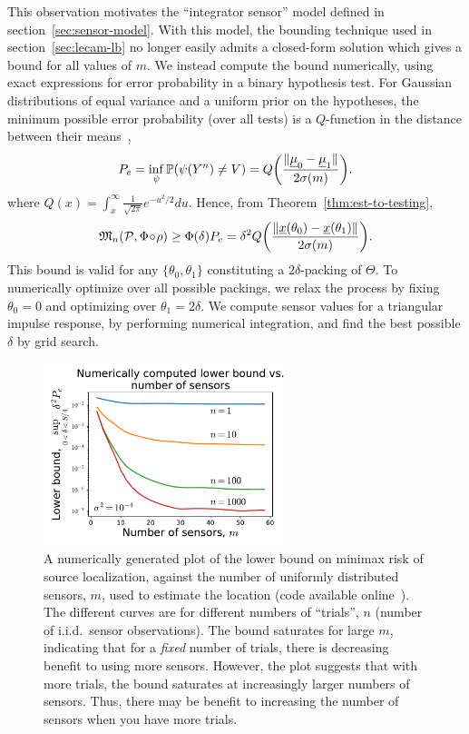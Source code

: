 \documentclass[conference]{IEEEtran}
\providecommand{\v}{}
\renewcommand{\v}[1]{\underline{#1}}
\DeclarePairedDelimiter\norm{\lVert}{\rVert}
\newcommand{\Phiorho}{\Phi\!\circ\!\rho}
\begin{document}
This observation motivates the ``integrator sensor'' model defined in
section~\ref{sec:sensor-model}. With this model, the bounding technique used in
section~\ref{sec:lecam-lb} no longer easily admits a closed-form solution which
gives a bound for all values of $m$. We instead compute the bound numerically,
using exact expressions for error probability in a binary hypothesis test. For
Gaussian distributions of equal variance and a uniform prior on the hypotheses,
the minimum possible error probability (over all tests) is a $Q$-function in
the distance between their means~\cite[Ch.~7]{Scharf1991Statistical},
\begin{equation}
	P_e = \inf_\psi \mathbb P(\psi(Y^n) \neq V) = Q\bigg(\frac{\norm{\v\mu_0 - \v\mu_1}}{2\sigma(m)}\bigg).
\end{equation}
where $Q(x) = \int_x^\infty \frac{1}{\sqrt{2\pi}} e^{-u^2/2} du$. Hence, from
Theorem~\ref{thm:est-to-testing},
\begin{equation}
	\mathfrak{M}_n(\mathcal{P}, \Phiorho) \geq \Phi(\delta) P_e = \delta^2 Q\bigg(\frac{\norm{\v x(\theta_0) - \v x(\theta_1)}}{2\sigma(m)}\bigg).
\end{equation}
This bound is valid for any $\{\theta_0, \theta_1\}$ constituting a
$2\delta$-packing of $\Theta$. To numerically optimize over all possible
packings, we relax the process by fixing $\theta_0 = 0$ and optimizing over
$\theta_1 = 2\delta$.  We compute sensor values for a triangular impulse
response, by performing numerical integration, and find the best possible
$\delta$ by grid search.

\begin{figure}[t]
	\centering
	\includegraphics[width=2.8in]{lb-vs-m-annotated}
	\caption{A numerically generated plot of the lower bound on minimax risk of
		source localization, against the number of uniformly distributed
		sensors, $m$, used to estimate the location (code available
		online~\cite{Code}). The different curves are for different numbers of
		``trials'', $n$ (number of i.i.d.\ sensor observations). The bound
		saturates for large $m$, indicating that for a \emph{fixed} number of
		trials, there is decreasing benefit to using more sensors.  However,
		the plot suggests that with more trials, the bound saturates at
		increasingly larger numbers of sensors. Thus, there may be benefit to
		increasing the number of sensors when you have more trials.}
	\label{fig:numerical}
\end{figure}
\end{document}
